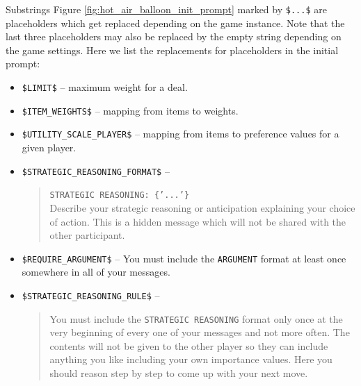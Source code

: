 \documentclass[../main.tex]{subfiles}
\begin{document}
\smallskip
\noindent Substrings Figure \ref{fig:hot_air_balloon_init_prompt} marked by \texttt{\$...\$} are placeholders which get replaced depending on the game instance.
Note that the last three placeholders may also be replaced by the empty string depending on the game settings. Here we list the replacements for placeholders in the initial prompt:
\begin{itemize}
  \item \texttt{\$LIMIT\$} – maximum weight for a deal.
  \item \texttt{\$ITEM\_WEIGHTS\$} – mapping from items to weights.
  \item \texttt{\$UTILITY\_SCALE\_PLAYER\$} – mapping from items to preference values for a given player.
  \item \texttt{\$STRATEGIC\_REASONING\_FORMAT\$} – 
    \begin{quote}
    \texttt{STRATEGIC REASONING: \{'...'\}}\\
    Describe your strategic reasoning or anticipation explaining your choice of action. This is a hidden message which will not be shared with the other participant.
    \end{quote}
  \item \texttt{\$REQUIRE\_ARGUMENT\$} – You must include the \texttt{ARGUMENT} format at least once somewhere in all of your messages.
  \item \texttt{\$STRATEGIC\_REASONING\_RULE\$} – 
    \begin{quote}
    You must include the \texttt{STRATEGIC REASONING} format only once at the very beginning of every one of your messages and not more often. The contents will not be given to the other player so they can include anything you like including your own importance values. Here you should reason step by step to come up with your next move.
    \end{quote}
\end{itemize}
\end{document}
